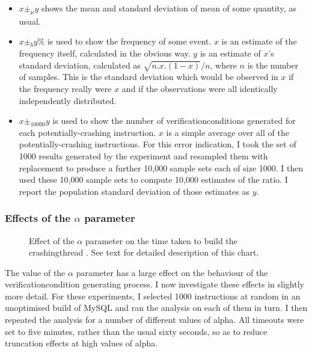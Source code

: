 \begin{itemize}
\item $x \pm_\mu y$ shows the mean and standard deviation of mean of
  some quantity, as usual.
\item $x \pm_b y$\% is used to show the frequency of some event.  $x$
  is an estimate of the frequency itself, calculated in the obvious
  way.  $y$ is an estimate of $x$'s standard deviation, calculated as
  $\sqrt{n.x.(1-x)}/n$, where $n$ is the number of samples.  This is
  the standard deviation which would be observed in $x$ if the
  frequency really were $x$ and if the observations were all
  identically independently distributed.
\item $x \pm_{10000} y$ is used to show the number of
  \glspl{verificationcondition} generated for each
  potentially-crashing instruction.  $x$ is a simple average over all
  of the potentially-crashing instructions.  For this error
  indication, I took the set of 1000 results generated by the
  experiment and resampled them with replacement to produce a further
  10,000 sample sets each of size 1000.  I then used these 10,000
  sample sets to compute 10,000 estimates of the ratio.  I report the
  population standard deviation of those estimates as $y$.
\end{itemize}

\subsubsection{Effects of the $\alpha$ parameter}
\label{sect:eval:alpha}


\begin{figure}
  \centerline{}
  \caption{Effect of the $\alpha$ parameter on the time taken to build
    the \gls{crashingthread} {\StateMachines}.  See text for detailed
    description of this chart.}
  \label{fig:perf:alpha:bpm:unopt}
\end{figure}

The value of the $\alpha$ parameter has a large effect on the
behaviour of the \gls{verificationcondition} generating process.  I
now investigate these effects in slightly more detail.  For these
experiments, I selected 1000 instructions at random in an unoptimised
build of MySQL and ran the analysis on each of them in turn.  I then
repeated the analysis for a number of different values of \gls{alpha}.
All timeouts were set to five minutes, rather than the usual sixty
seconds, so as to reduce truncation effects at high values of
\gls{alpha}.

